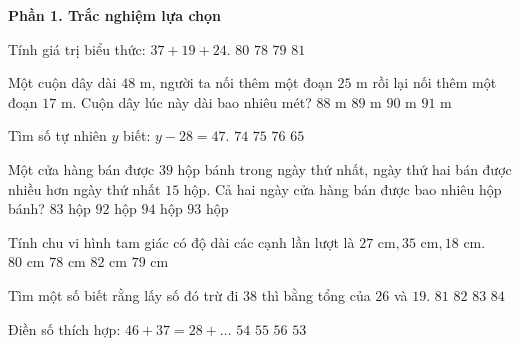 \textbf{Phần 1. Trắc nghiệm lựa chọn}

\begin{ex} %
Tính giá trị biểu thức: $37 + 19 + 24$.
\choice
{\True $80$}
{$78$}
{$79$}
{$81$}
\end{ex}

\begin{ex} %
Một cuộn dây dài $48\text{ m}$, người ta nối thêm một đoạn $25\text{ m}$ rồi lại nối thêm một đoạn $17\text{ m}$. Cuộn dây lúc này dài bao nhiêu mét?
\choice
{$88\text{ m}$}
{$89\text{ m}$}
{\True $90\text{ m}$}
{$91\text{ m}$}
\end{ex}

\begin{ex} %
Tìm số tự nhiên $y$ biết: $y - 28 = 47$.
\choice
{$74$}
{\True $75$}
{$76$}
{$65$}
\end{ex}

\begin{ex} %
Một cửa hàng bán được $39$ hộp bánh trong ngày thứ nhất, ngày thứ hai bán được nhiều hơn ngày thứ nhất $15$ hộp. Cả hai ngày cửa hàng bán được bao nhiêu hộp bánh?
\choice
{$83$ hộp}
{$92$ hộp}
{$94$ hộp}
{\True $93$ hộp}
\end{ex}

\begin{ex} %
Tính chu vi hình tam giác có độ dài các cạnh lần lượt là $27\text{ cm}, 35\text{ cm}, 18\text{ cm}$.
\choice
{\True $80\text{ cm}$}
{$78\text{ cm}$}
{$82\text{ cm}$}
{$79\text{ cm}$}
\end{ex}

\begin{ex} %
Tìm một số biết rằng lấy số đó trừ đi $38$ thì bằng tổng của $26$ và $19$.
\choice
{$81$}
{$82$}
{\True $83$}
{$84$}
\end{ex}

\begin{ex} %
Điền số thích hợp: $46 + 37 = 28 + \dots$
\choice
{$54$}
{\True $55$}
{$56$}
{$53$}
\end{ex}

